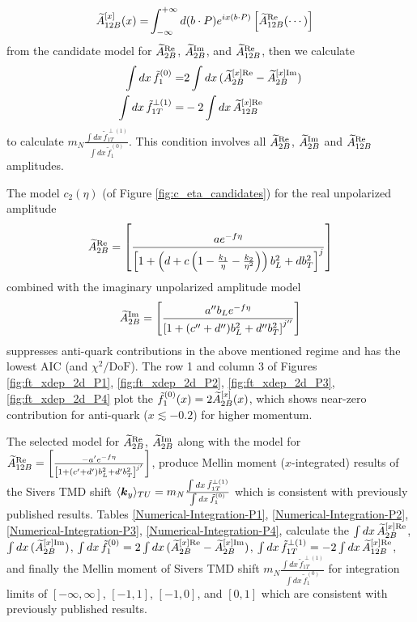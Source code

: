 \begin{itemize}
\begin{align}
        \widetilde{A}^{[x]}_{12B}(x)=&\int_{-\infty}^{+\infty} d(b\cdot P)e^{ix(b\cdot P)} \left[\widetilde{A}_{12B}^{\text{Re}}(\cdots)\right]
    \end{align}
    from the candidate model for $\widetilde{A}_{2B}^{\text{Re}}$, $\widetilde{A}_{2B}^{\text{Im}}$, and $\widetilde{A}_{12B}^{\text{Re}}$, then we calculate
    \begin{align}
        \int dx\, \tilde{f}_1^{(0)} =& 2\int dx\, (\widetilde{A}^{[x]\text{Re}}_{2B} - \widetilde{A}^{[x]\text{Im}}_{2B})\\
        \int dx\, \tilde{f}_{1T}^{\perp(1)} =& -2\int dx\, \widetilde{A}^{[x]\text{Re}}_{12B}
    \end{align}
    to calculate $m_N \frac{\int dx\, \tilde{f}_{1T}^{\perp(1)}}{\int dx\, \tilde{f}_1^{(0)}}$. This condition involves all $\widetilde{A}_{2B}^{\text{Re}}$, $\widetilde{A}_{2B}^{\text{Im}}$ and $\widetilde{A}_{12B}^{\text{Re}}$ amplitudes. 
\end{itemize}

The model $c_2(\eta)$ (of Figure \ref{fig:c_eta_candidates}) for the real unpolarized amplitude
\[
\widetilde{A}_{2B}^{\text{Re}}=\left[\frac{a e^{-f \eta}}{\left[1 + \left(d + c\left(1 - \frac{k_1}{\eta} - \frac{k_2}{\eta^2}\right)\right) b_L^2 + d b_T^2\right]^j}\right]
\]
combined with the imaginary unpolarized amplitude model
\[
\widetilde{A}_{2B}^{\text{Im}}=\left[\frac{a^{\prime\prime} b_L e^{-f \eta}}{\left[1 + (c^{\prime\prime} + d^{\prime\prime}) b_L^2 + d^{\prime\prime}b_T^2\right]^{j^{\prime\prime}}}\right]
\]
suppresses anti-quark contributions in the above mentioned regime and has the lowest AIC (and $\chi^2/\mathrm{DoF}$). The row 1 and column 3 of Figures \ref{fig:ft_xdep_2d_P1}, \ref{fig:ft_xdep_2d_P2}, \ref{fig:ft_xdep_2d_P3}, \ref{fig:ft_xdep_2d_P4} plot the $\tilde{f}^{(0)}_{1}(x)=2\widetilde{A}^{[x]}_{2B}(x)$, which shows near-zero contribution for anti-quark ($x\lesssim-0.2$) for higher momentum.

The selected model for $\widetilde{A}_{2B}^{\text{Re}}$, $\widetilde{A}_{2B}^{\text{Im}}$ along with the model for $\widetilde{A}_{12B}^{\text{Re}}=\left[\frac{-a^{\prime} e^{-f \eta}}{\left[1 + (c^{\prime} + d^{\prime}) b_L^2 + d^{\prime} b_T^2\right]^{j^{\prime}}}\right]$, produce Mellin moment ($x$-integrated) results of the Sivers TMD shift $\langle \boldsymbol{k}_y \rangle_{TU}=m_N \frac{\int dx\, \tilde{f}_{1T}^{\perp(1)}}{\int dx\, \tilde{f}_1^{(0)}}$ which is consistent with previously published results. Tables \ref{Numerical-Integration-P1}, \ref{Numerical-Integration-P2}, \ref{Numerical-Integration-P3}, \ref{Numerical-Integration-P4}, calculate the $\int dx\, \widetilde{A}^{[x]\text{Re}}_{2B}$, $\int dx\, (\widetilde{A}^{[x]\text{Im}}_{2B})$, $\int dx\, \tilde{f}_1^{(0)} = 2\int dx\, (\widetilde{A}^{[x]\text{Re}}_{2B} - \widetilde{A}^{[x]\text{Im}}_{2B})$, $\int dx\, \tilde{f}_{1T}^{\perp(1)} = -2\int dx\, \widetilde{A}^{[x]\text{Re}}_{12B}$, and finally the Mellin moment of Sivers TMD shift $m_N \frac{\int dx\, \tilde{f}_{1T}^{\perp(1)}}{\int dx\, \tilde{f}_1^{(0)}}$ for integration limits of $[-\infty, \infty]$, $[-1, 1]$, $[-1, 0]$, and $[0, 1]$ which are consistent with previously published results.

